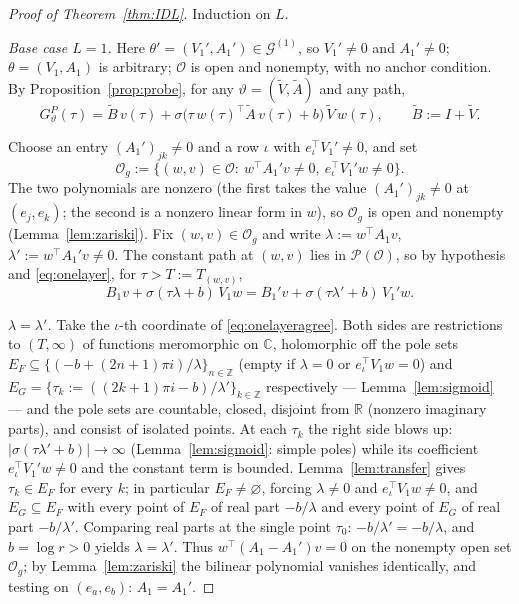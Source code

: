 \documentclass[11pt]{article}
\theoremstyle{definition}
\theoremstyle{remark}
\theoremstyle{plain}
\newcommand{\R}{\mathbb{R}}
\newcommand{\C}{\mathbb{C}}
\newcommand{\Z}{\mathbb{Z}}
\newcommand{\cO}{\mathcal{O}}
\newcommand{\cP}{\mathcal{P}}
\newcommand{\cG}{\mathcal{G}}
\newcommand{\sig}{\sigma}
\begin{document}
\begin{proof}[Proof of Theorem~\ref{thm:IDL}]
Induction on $L$.

\emph{Base case $L=1$.}  Here $\theta'=(V_1',A_1')\in\cG^{(1)}$, so $V_1'\neq0$ and
$A_1'\neq0$; $\theta=(V_1,A_1)$ is arbitrary; $\cO$ is open and nonempty, with no
anchor condition.  By Proposition~\ref{prop:probe}, for any $\vartheta=(\widetilde
V,\widetilde A)$ and any path,
\begin{equation}\label{eq:onelayer}
G^P_\vartheta(\tau)=\widetilde B\,v(\tau)
+\sig\big(\tau\,w(\tau)^\top\widetilde A\,v(\tau)+b\big)\,\widetilde V\,w(\tau),
\qquad \widetilde B:=I+\widetilde V .
\end{equation}

Choose an entry $(A_1')_{jk}\neq0$ and a row $\iota$ with $e_\iota^\top V_1'\neq0$, and
set
\[
\cO_g:=\{(w,v)\in\cO:\ w^\top A_1'v\neq0,\ e_\iota^\top V_1'w\neq0\}.
\]
The two polynomials are nonzero (the first takes the value $(A_1')_{jk}\neq0$ at
$(e_j,e_k)$; the second is a nonzero linear form in $w$), so $\cO_g$ is open and
nonempty (Lemma~\ref{lem:zariski}).  Fix $(w,v)\in\cO_g$ and write
$\lambda:=w^\top A_1v$, $\lambda':=w^\top A_1'v\neq0$.  The constant path at $(w,v)$
lies in $\cP(\cO)$, so by hypothesis and \eqref{eq:onelayer}, for $\tau>T:=T_{(w,v)}$,
\begin{equation}\label{eq:onelayeragree}
B_1v+\sig(\tau\lambda+b)\,V_1w
=B_1'v+\sig(\tau\lambda'+b)\,V_1'w .
\end{equation}

\emph{$\lambda=\lambda'$.}  Take the $\iota$-th coordinate of
\eqref{eq:onelayeragree}.  Both sides are restrictions to $(T,\infty)$ of functions
meromorphic on $\C$, holomorphic off the pole sets
$E_F\subseteq\{(-b+(2n+1)\pi i)/\lambda\}_{n\in\Z}$ (empty if $\lambda=0$ or
$e_\iota^\top V_1w=0$) and $E_G=\{\tau_k:=((2k+1)\pi i-b)/\lambda'\}_{k\in\Z}$
respectively --- Lemma~\ref{lem:sigmoid} --- and the pole sets are countable, closed,
disjoint from $\R$ (nonzero imaginary parts), and consist of isolated points.  At each
$\tau_k$ the right side blows up: $|\sig(\tau\lambda'+b)|\to\infty$
(Lemma~\ref{lem:sigmoid}: simple poles) while its coefficient
$e_\iota^\top V_1'w\neq0$ and the constant term is bounded.  Lemma~\ref{lem:transfer}
gives $\tau_k\in E_F$ for every $k$; in particular $E_F\neq\varnothing$, forcing
$\lambda\neq0$ and $e_\iota^\top V_1w\neq0$, and $E_G\subseteq E_F$ with every point of
$E_F$ of real part $-b/\lambda$ and every point of $E_G$ of real part $-b/\lambda'$.
Comparing real parts at the single point $\tau_0$:
$-b/\lambda'=-b/\lambda$, and $b=\log r>0$ yields $\lambda=\lambda'$.  Thus
$w^\top(A_1-A_1')v=0$ on the nonempty open set $\cO_g$; by Lemma~\ref{lem:zariski} the
bilinear polynomial vanishes identically, and testing on $(e_a,e_b)$: $A_1=A_1'$.


\end{proof}
\end{document}
